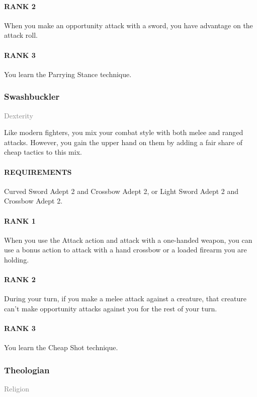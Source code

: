 \paragraph{RANK 2} When you make an opportunity attack with a sword, you have advantage on the attack roll.
\paragraph{RANK 3} You learn the Parrying Stance technique.

\subsubsection{Swashbuckler} \label{feat::swashbuckler}
\small{\textcolor{gray}{Dexterity}}

\normalsize
Like modern fighters, you mix your combat style with both melee and ranged attacks.
However, you gain the upper hand on them by adding a fair share of cheap tactics to this mix.
\paragraph{REQUIREMENTS} Curved Sword Adept 2 and Crossbow Adept 2, or Light Sword Adept 2 and Crossbow Adept 2.
\paragraph{RANK 1} When you use the Attack action and attack with a one-handed weapon, you can use a bonus action to attack with a hand crossbow or a loaded firearm you are holding.
\paragraph{RANK 2} During your turn, if you make a melee attack against a creature, that creature can't make opportunity attacks against you for the rest of your turn.
\paragraph{RANK 3} You learn the Cheap Shot technique.

\subsubsection{Theologian} \label{feat::theologian}
\small{\textcolor{gray}{Religion}}

